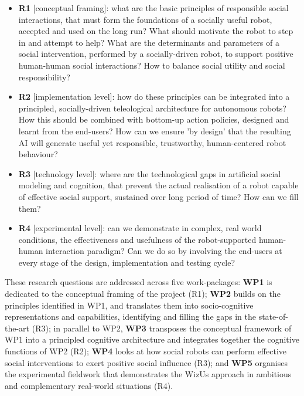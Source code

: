 \documentclass[11pt,a4paper]{report}
\newcommand{\project}{WizUs\xspace}
\begin{document}
\begin{itemize}
    \item \textbf{R1} [conceptual framing]: what are the basic principles of
        responsible social interactions, that must form the foundations of a
        socially useful robot, accepted and used on the long run? What should
        motivate the robot to step in and attempt to help? What are the
        determinants and parameters of a social intervention, performed by a
        socially-driven robot, to support positive human-human social
        interactions? How to balance social utility and social responsibility?

    \item \textbf{R2} [implementation level]: how do these principles
        can be integrated into a principled, socially-driven teleological
        architecture for autonomous robots? How this should be combined with
        bottom-up action policies, designed and learnt from the end-users? How
        can we ensure 'by design' that the resulting AI will generate useful yet
        responsible, trustworthy, human-centered robot behaviour?

    \item \textbf{R3} [technology level]: where are the technological gaps in
        artificial social modeling and cognition, that prevent the actual
        realisation of a robot capable of effective social support, sustained
        over long period of time? How can we fill them?

    \item \textbf{R4} [experimental level]: can we demonstrate in complex, real
        world conditions, the effectiveness and usefulness of the
        robot-supported human-human interaction paradigm? Can we do so by
        involving the end-users at every stage of the design, implementation and
        testing cycle?

\end{itemize}


These research questions are addressed across five work-packages: \textbf{WP1}
is dedicated to the conceptual framing of the project (R1); \textbf{WP2} builds
on the principles identified in WP1, and translates them into socio-cognitive
representations and capabilities, identifying and filling the gaps in the
state-of-the-art (R3); in parallel to WP2, \textbf{WP3} transposes the
conceptual framework of WP1 into a principled cognitive architecture and
integrates together the cognitive functions of WP2 (R2); \textbf{WP4} looks at
how social robots can perform effective social interventions to exert positive
social influence (R3); and \textbf{WP5} organises the experimental fieldwork
that demonstrates the \project approach in ambitious and
complementary real-world situations (R4).
\end{document}
